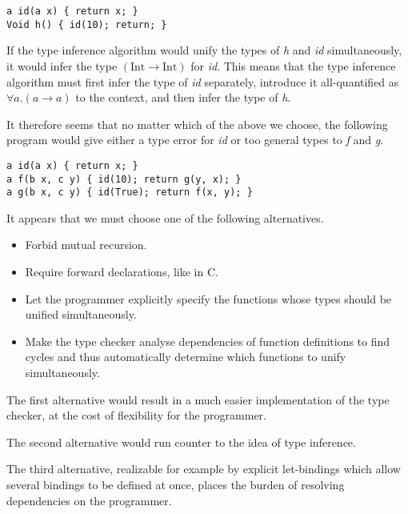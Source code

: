 \documentclass[a4paper]{article}
\newcommand{\arr}{\rightarrow}
\begin{document}
\begin{verbatim}
a id(a x) { return x; }
Void h() { id(10); return; }
\end{verbatim}

If the type inference algorithm would unify the types of \emph{h} and \emph{id}
simultaneously, it would infer the type $(\text{Int} \arr \text{Int})$ for
\emph{id}.  This means that the type inference algorithm must first infer the
type of \emph{id} separately, introduce it all-quantified as $\forall a . (a
\arr a)$ to the context, and then infer the type of \emph{h}.

It therefore seems that no matter which of the above we choose, the following
program would give either a type error for \emph{id} or too general types to
\emph{f} and \emph{g}.

\begin{verbatim}
a id(a x) { return x; }
a f(b x, c y) { id(10); return g(y, x); }
a g(b x, c y) { id(True); return f(x, y); }
\end{verbatim}

It appears that we must choose one of the following alternatives.

\begin{itemize}
  
  \item Forbid mutual recursion.

  \item Require forward declarations, like in C.

  \item Let the programmer explicitly specify the functions whose types should
  be unified simultaneously.

  \item Make the type checker analyse dependencies of function definitions to
  find cycles and thus automatically determine which functions to unify
  simultaneously.

\end{itemize}

The first alternative would result in a much easier implementation of the type
checker, at the cost of flexibility for the programmer.

The second alternative would run counter to the idea of type inference.

The third alternative, realizable for example by explicit let-bindings which
allow several bindings to be defined at once, places the burden of resolving
dependencies on the programmer.
\end{document}
